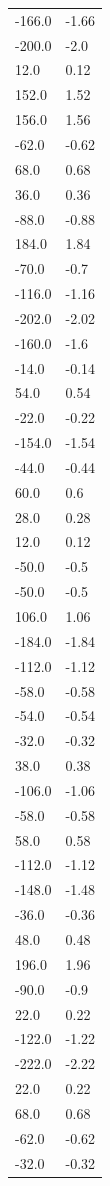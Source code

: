 \begin{longtable}{ll}
-166.0 & -1.66 \\
-200.0 & -2.0 \\
12.0 & 0.12 \\
152.0 & 1.52 \\
156.0 & 1.56 \\
-62.0 & -0.62 \\
68.0 & 0.68 \\
36.0 & 0.36 \\
-88.0 & -0.88 \\
184.0 & 1.84 \\
-70.0 & -0.7 \\
-116.0 & -1.16 \\
-202.0 & -2.02 \\
-160.0 & -1.6 \\
-14.0 & -0.14 \\
54.0 & 0.54 \\
-22.0 & -0.22 \\
-154.0 & -1.54 \\
-44.0 & -0.44 \\
60.0 & 0.6 \\
28.0 & 0.28 \\
12.0 & 0.12 \\
-50.0 & -0.5 \\
-50.0 & -0.5 \\
106.0 & 1.06 \\
-184.0 & -1.84 \\
-112.0 & -1.12 \\
-58.0 & -0.58 \\
-54.0 & -0.54 \\
-32.0 & -0.32 \\
38.0 & 0.38 \\
-106.0 & -1.06 \\
-58.0 & -0.58 \\
58.0 & 0.58 \\
-112.0 & -1.12 \\
-148.0 & -1.48 \\
-36.0 & -0.36 \\
48.0 & 0.48 \\
196.0 & 1.96 \\
-90.0 & -0.9 \\
22.0 & 0.22 \\
-122.0 & -1.22 \\
-222.0 & -2.22 \\
22.0 & 0.22 \\
68.0 & 0.68 \\
-62.0 & -0.62 \\
-32.0 & -0.32 \\

\end{longtable}
